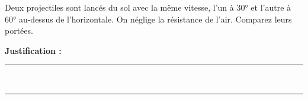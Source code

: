 Deux projectiles sont lancés du sol avec la même vitesse, l'un à \ang{30} et l'autre à \ang{60} au-dessus de l'horizontale. On néglige la résistance de l'air. Comparez leurs portées.

\choices

\noindent\textbf{Justification :} \hrulefill \\[2.5ex]
\rule{\linewidth}{0.4pt} \\[2.5ex]
\rule{\linewidth}{0.4pt}
\vfill
